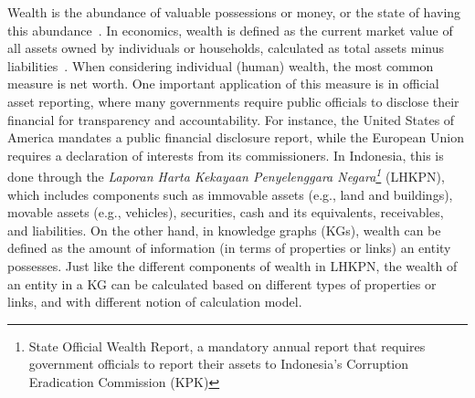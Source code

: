 
Wealth is the abundance of valuable possessions or money, or the state of having this abundance~\cite{wealthOed}. In economics, wealth is defined as the current market value of all assets owned by individuals or households, calculated as total assets minus liabilities~\cite{SaezG16}. When considering individual (human) wealth, the most common measure is net worth. One important application of this measure is in official asset reporting, where many governments require public officials to disclose their financial for transparency and accountability. For instance, the United States of America mandates a public financial disclosure report, while the European Union requires a declaration of interests from its commissioners. In Indonesia, this is done through the \textit{Laporan Harta Kekayaan Penyelenggara Negara\footnote{State Official Wealth Report, a mandatory annual report that requires government officials to report their assets to Indonesia's Corruption Eradication Commission (KPK)}} (LHKPN), which includes components such as immovable assets (e.g., land and buildings), movable assets (e.g., vehicles), securities, cash and its equivalents, receivables, and liabilities. On the other hand, in knowledge graphs (KGs), wealth can be defined as the amount of information (in terms of properties or links) an entity possesses. Just like the different components of wealth in LHKPN, the wealth of an entity in a KG can be calculated based on different types of properties or links, and with different notion of calculation model.

